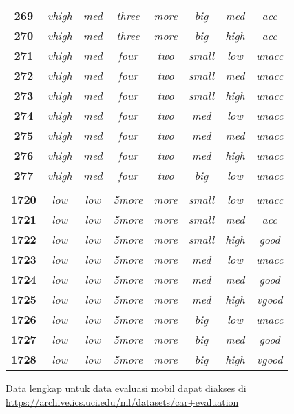 \begin{longtable}[c]{cccccccc}
\textbf{269} & \textit{vhigh} & \textit{med} & \textit{three} & \textit{more} & \textit{big} & \textit{med} & \textit{acc} \\
\textbf{270} & \textit{vhigh} & \textit{med} & \textit{three} & \textit{more} & \textit{big} & \textit{high} & \textit{acc} \\
\textbf{271} & \textit{vhigh} & \textit{med} & \textit{four} & \textit{two} & \textit{small} & \textit{low} & \textit{unacc} \\
\textbf{272} & \textit{vhigh} & \textit{med} & \textit{four} & \textit{two} & \textit{small} & \textit{med} & \textit{unacc} \\
\textbf{273} & \textit{vhigh} & \textit{med} & \textit{four} & \textit{two} & \textit{small} & \textit{high} & \textit{unacc} \\
\textbf{274} & \textit{vhigh} & \textit{med} & \textit{four} & \textit{two} & \textit{med} & \textit{low} & \textit{unacc} \\
\textbf{275} & \textit{vhigh} & \textit{med} & \textit{four} & \textit{two} & \textit{med} & \textit{med} & \textit{unacc} \\
\textbf{276} & \textit{vhigh} & \textit{med} & \textit{four} & \textit{two} & \textit{med} & \textit{high} & \textit{unacc} \\
\textbf{277} & \textit{vhigh} & \textit{med} & \textit{four} & \textit{two} & \textit{big} & \textit{low} & \textit{unacc} \\
      &       &       &       &       &       &       &  \\
\textbf{1720} & \textit{low} & \textit{low} & \textit{5more} & \textit{more} & \textit{small} & \textit{low} & \textit{unacc} \\
\textbf{1721} & \textit{low} & \textit{low} & \textit{5more} & \textit{more} & \textit{small} & \textit{med} & \textit{acc} \\
\textbf{1722} & \textit{low} & \textit{low} & \textit{5more} & \textit{more} & \textit{small} & \textit{high} & \textit{good} \\
\textbf{1723} & \textit{low} & \textit{low} & \textit{5more} & \textit{more} & \textit{med} & \textit{low} & \textit{unacc} \\
\textbf{1724} & \textit{low} & \textit{low} & \textit{5more} & \textit{more} & \textit{med} & \textit{med} & \textit{good} \\
\textbf{1725} & \textit{low} & \textit{low} & \textit{5more} & \textit{more} & \textit{med} & \textit{high} & \textit{vgood} \\
\textbf{1726} & \textit{low} & \textit{low} & \textit{5more} & \textit{more} & \textit{big} & \textit{low} & \textit{unacc} \\
\textbf{1727} & \textit{low} & \textit{low} & \textit{5more} & \textit{more} & \textit{big} & \textit{med} & \textit{good} \\
\textbf{1728} & \textit{low} & \textit{low} & \textit{5more} & \textit{more} & \textit{big} & \textit{high} & \textit{vgood} \\
\end{longtable}

\vspace*{-\baselineskip}
Data lengkap untuk data evaluasi mobil dapat diakses di \url{https://archive.ics.uci.edu/ml/datasets/car+evaluation}